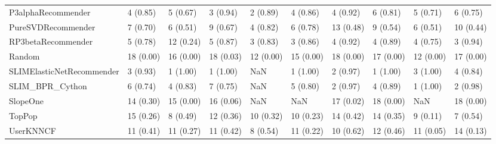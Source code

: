 \begin{tabular}{llllllllll}
                 P3alphaRecommender &                 4 (0.85) &    5 (0.67) &      3 (0.94) &     2 (0.89) &             4 (0.86) &            4 (0.92) &          6 (0.81) &           5 (0.71) &          6 (0.75) \\
                 PureSVDRecommender &                 7 (0.70) &    6 (0.51) &      9 (0.67) &     4 (0.82) &             6 (0.78) &           13 (0.48) &          9 (0.54) &           6 (0.51) &         10 (0.44) \\
                 RP3betaRecommender &                 5 (0.78) &   12 (0.24) &      5 (0.87) &     3 (0.83) &             3 (0.86) &            4 (0.92) &          4 (0.89) &           4 (0.75) &          3 (0.94) \\
                             Random &                18 (0.00) &   16 (0.00) &     18 (0.03) &    12 (0.00) &            15 (0.00) &           18 (0.00) &         17 (0.00) &          12 (0.00) &         17 (0.00) \\
          SLIMElasticNetRecommender &                 3 (0.93) &    1 (1.00) &      1 (1.00) &          NaN &             1 (1.00) &            2 (0.97) &          1 (1.00) &           3 (1.00) &          4 (0.84) \\
                    SLIM\_BPR\_Cython &                 6 (0.74) &    4 (0.83) &      7 (0.75) &          NaN &             5 (0.80) &            2 (0.97) &          4 (0.89) &           1 (1.00) &          2 (0.98) \\
                           SlopeOne &                14 (0.30) &   15 (0.00) &     16 (0.06) &          NaN &                  NaN &           17 (0.02) &         18 (0.00) &                NaN &         18 (0.00) \\
                             TopPop &                15 (0.26) &    8 (0.49) &     12 (0.36) &    10 (0.32) &            10 (0.23) &           14 (0.42) &         14 (0.35) &           9 (0.11) &          7 (0.54) \\
                          UserKNNCF &                11 (0.41) &   11 (0.27) &     11 (0.42) &     8 (0.54) &            11 (0.22) &           10 (0.62) &         12 (0.46) &          11 (0.05) &         14 (0.13) \\
\bottomrule
\end{tabular}
